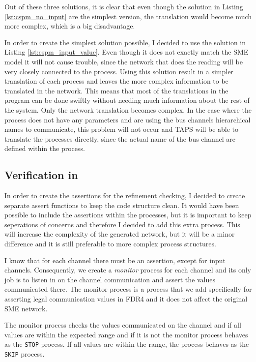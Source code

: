 Out of these three solutions, it is clear that even though the solution in Listing \ref{lst:cspm_no_input} are the simplest version, the translation would become much more complex, which is a big disadvantage.

In order to create the simplest solution possible, I decided to use the solution in Listing \ref{lst:cspm_input_value}. Even though it does not exactly match the SME model it will not cause trouble, since the network that does the reading will be very closely connected to the process. Using this solution result in a simpler translation of each process and leaves the more complex information to be translated in the network. This means that most of the translations in the program can be done swiftly without needing much information about the rest of the system. Only the network translation becomes complex.
In the case where the process does not have any parameters and are using the bus channels hierarchical names to communicate, this problem will not occur and TAPS will be able to translate the processes directly, since the actual name of the bus channel are defined within the process.

\subsection{Verification in \cspm{}}
In order to create the assertions for the refinement checking, I decided to create separate assert functions to keep the code structure clean. It would have been possible to include the assertions within the processes, but it is important to keep seperations of concerns and therefore I decided to add this extra process. This will increase the complexity of the generated \cspm{} network, but it will be a minor difference and it is still preferable to more complex process structures.

I know that for each \cspm{} channel there must be an assertion, except for input channels. Consequently, we create a \textit{monitor} process for each channel and its only job is to listen in on the channel communication and assert the values communicated there. The monitor process is a process that we add specifically for asserting legal communication values in FDR4 and it does not affect the original SME network.

The monitor process checks the values communicated on the channel and if all values are within the expected range and if it is not the monitor process behaves as the \texttt{STOP} process. If all values are within the range, the process behaves as the \texttt{SKIP} process.

